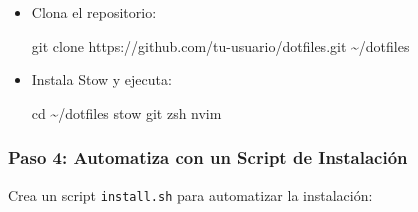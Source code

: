 \documentclass[
  jou,
  floatsintext,
  longtable,
  a4paper,
  nolmodern,
  notxfonts,
  notimes,
  colorlinks=true,linkcolor=blue,citecolor=blue,urlcolor=blue]{apa7}
\newenvironment{Shaded}{\begin{snugshade}}{\end{snugshade}}
\newcommand{\BuiltInTok}[1]{\textcolor[rgb]{0.00,0.23,0.31}{#1}}
\newcommand{\ExtensionTok}[1]{\textcolor[rgb]{0.00,0.23,0.31}{#1}}
\newcommand{\FunctionTok}[1]{\textcolor[rgb]{0.28,0.35,0.67}{#1}}
\newcommand{\NormalTok}[1]{\textcolor[rgb]{0.00,0.23,0.31}{#1}}
\begin{document}
\begin{enumerate}
  \begin{itemize}
  \item
    Clona el repositorio:

\begin{Shaded}
\begin{Highlighting}[]
\FunctionTok{git}\NormalTok{ clone https://github.com/tu{-}usuario/dotfiles.git \textasciitilde{}/dotfiles}
\end{Highlighting}
\end{Shaded}
  \item
    Instala Stow y ejecuta:

\begin{Shaded}
\begin{Highlighting}[]
\BuiltInTok{cd}\NormalTok{ \textasciitilde{}/dotfiles}
\ExtensionTok{stow}\NormalTok{ git zsh nvim}
\end{Highlighting}
\end{Shaded}
  \end{itemize}
\end{enumerate}

\subsubsection{Paso 4: Automatiza con un Script de
Instalación}\label{paso-4-automatiza-con-un-script-de-instalaciuxf3n}

Crea un script \texttt{install.sh} para automatizar la instalación:
\end{document}
